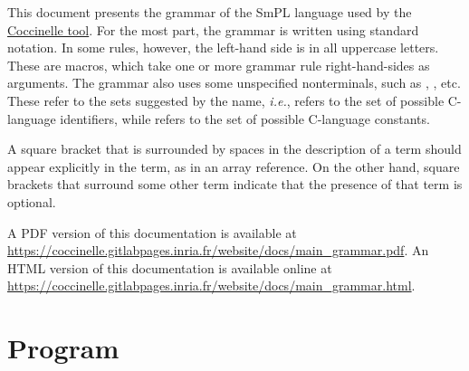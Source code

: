 

This document presents the grammar of the SmPL language used by the
\href{https://coccinelle.gitlabpages.inria.fr/website}{Coccinelle tool}.  For the most
part, the grammar is written using standard notation.  In some rules,
however, the left-hand side is in all uppercase letters.  These are
macros, which take one or more grammar rule right-hand-sides as
arguments.  The grammar also uses some unspecified nonterminals, such
as , , etc.  These refer to the sets suggested by
the name, {\em i.e.},  refers to the set of possible
C-language identifiers, while  refers to the set of
possible C-language constants.

A square bracket that is surrounded by spaces in the description of a term
should appear explicitly in the term, as in an array reference.  On the
other hand, square brackets that surround some other term indicate that the
presence of that term is optional.

%
\ifhevea
A PDF version of this documentation is available at
\url{https://coccinelle.gitlabpages.inria.fr/website/docs/main_grammar.pdf}.
\else
An HTML version of this documentation is available online at
\url{https://coccinelle.gitlabpages.inria.fr/website/docs/main_grammar.html}.
\fi

\section{Program}

\begin{grammar}


\end{grammar}

